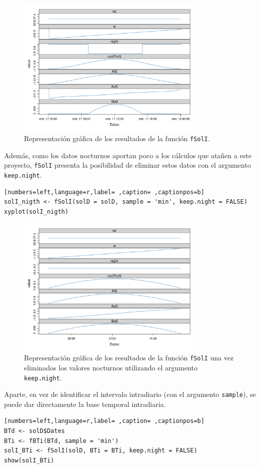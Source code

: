 \begin{figure}[!htb]
\centering
\includegraphics[width=0.8\textwidth]{figuras/codigo-solI.pdf}
\caption{Representación gráfica de los resultados de la función \texttt{fSolI}.}
\end{figure}
  Además, como los datos nocturnos aportan poco a los cálculos que atañen a este proyecto, \texttt{fSolI} presenta la posibilidad de eliminar estos datos con el argumento \texttt{keep.night}.
\begin{lstlisting}[numbers=left,language=r,label= ,caption= ,captionpos=b]
solI_nigth <- fSolI(solD = solD, sample = 'min', keep.night = FALSE)
xyplot(solI_nigth)
\end{lstlisting}

\begin{figure}[!htb]
\centering
\includegraphics[width=0.8\textwidth]{figuras/codigo-solInight.pdf}
\caption{Representación gráfica de los resultados de la función \texttt{fSolI} una vez eliminados los valores nocturnos utilizando el argumento \texttt{keep.night}.}
\end{figure}
\FloatBarrier
Aparte, en vez de identificar el intervalo intradiario (con el argumento \texttt{sample}), se puede dar directamente la base temporal intradiaria.
\begin{lstlisting}[numbers=left,language=r,label= ,caption= ,captionpos=b]
BTd <- solD$Dates
BTi <- fBTi(BTd, sample = 'min')
solI_BTi <- fSolI(solD, BTi = BTi, keep.night = FALSE)
show(solI_BTi)
\end{lstlisting}

